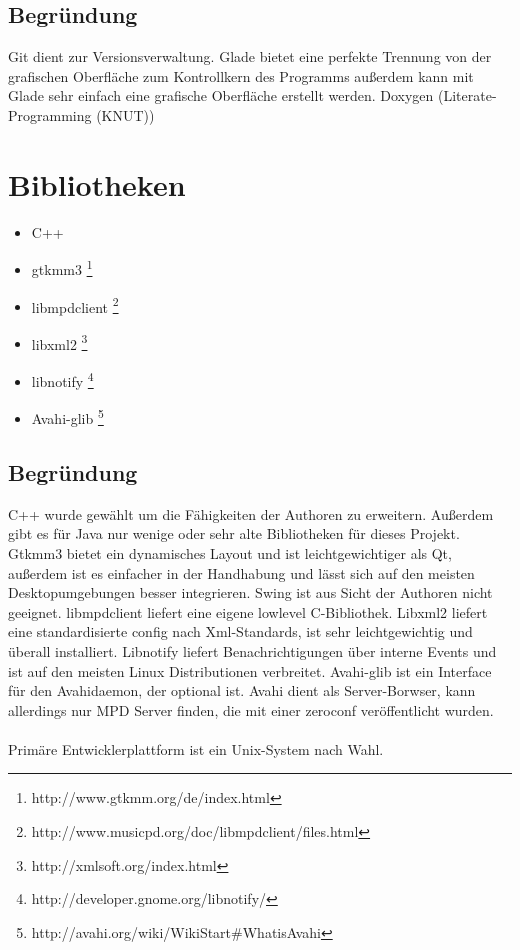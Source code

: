 \subsection{Begründung}
Git dient zur Versionsverwaltung. Glade bietet eine perfekte Trennung von der grafischen 
Oberfläche zum Kontrollkern des Programms außerdem kann mit Glade sehr
einfach eine grafische Oberfläche erstellt werden. Doxygen (Literate-Programming (KNUT))
\section{Bibliotheken}
\begin{itemize}
\item C++
\item gtkmm3 \footnote{http://www.gtkmm.org/de/index.html}
\item libmpdclient \footnote{http://www.musicpd.org/doc/libmpdclient/files.html}
\item libxml2 \footnote{http://xmlsoft.org/index.html}
\item libnotify \footnote{http://developer.gnome.org/libnotify/}
\item Avahi-glib \footnote{http://avahi.org/wiki/WikiStart\#WhatisAvahi}
\end{itemize}
\subsection{Begründung}
C++ wurde gewählt um die Fähigkeiten der Authoren zu erweitern. Außerdem gibt es für Java nur wenige
oder sehr alte Bibliotheken für dieses Projekt. Gtkmm3 bietet ein dynamisches Layout und ist
leichtgewichtiger als Qt, außerdem ist es einfacher in der Handhabung und lässt sich auf den meisten 
Desktopumgebungen besser integrieren. Swing ist aus Sicht der Authoren nicht geeignet.
libmpdclient liefert eine eigene lowlevel C-Bibliothek.
Libxml2 liefert eine standardisierte config nach Xml-Standards, ist sehr leichtgewichtig und überall
installiert. Libnotify liefert Benachrichtigungen über interne Events und ist auf den meisten Linux
Distributionen verbreitet. Avahi-glib ist ein Interface für den Avahidaemon, der optional ist. Avahi 
dient als Server-Borwser, kann allerdings nur MPD Server finden, die mit einer zeroconf veröffentlicht 
wurden.\ \\ \\
Primäre Entwicklerplattform ist ein Unix-System nach Wahl.
